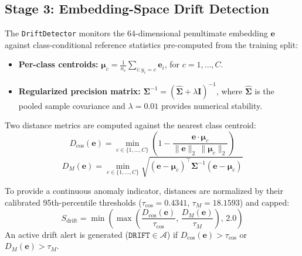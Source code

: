 \documentclass[journal]{IEEEtran}
\begin{document}
\subsection{Stage 3: Embedding-Space Drift Detection}
\label{sec:drift}
The \texttt{DriftDetector} monitors the 64-dimensional penultimate embedding $\mathbf{e}$ against class-conditional reference statistics pre-computed from the training split:
\begin{itemize}[leftmargin=*]
  \item \textbf{Per-class centroids:} $\boldsymbol{\mu}_c = \frac{1}{n_c} \sum_{i: y_i = c} \mathbf{e}_i$, for $c = 1, \ldots, C$.
  \item \textbf{Regularized precision matrix:} $\boldsymbol{\Sigma}^{-1} = (\hat{\boldsymbol{\Sigma}} + \lambda \mathbf{I})^{-1}$, where $\hat{\boldsymbol{\Sigma}}$ is the pooled sample covariance and $\lambda = 0.01$ provides numerical stability.
\end{itemize}

Two distance metrics are computed against the nearest class centroid:
\begin{equation}
  D_{\cos}(\mathbf{e}) = \min_{c \in \{1, \ldots, C\}} \left(1 - \frac{\mathbf{e} \cdot \boldsymbol{\mu}_c}{\|\mathbf{e}\|_2 \, \|\boldsymbol{\mu}_c\|_2}\right)
  \label{eq:cosine}
\end{equation}
\begin{equation}
  D_M(\mathbf{e}) = \min_{c \in \{1, \ldots, C\}} \sqrt{(\mathbf{e} - \boldsymbol{\mu}_c)^\top \boldsymbol{\Sigma}^{-1} (\mathbf{e} - \boldsymbol{\mu}_c)}
  \label{eq:mahalanobis}
\end{equation}

To provide a continuous anomaly indicator, distances are normalized by their calibrated 95th-percentile thresholds ($\tau_{\cos} = 0.4341$, $\tau_M = 18.1593$) and capped:
\begin{equation}
  S_{\text{drift}} = \min\left( \max\left( \frac{D_{\cos}(\mathbf{e})}{\tau_{\cos}}, \, \frac{D_M(\mathbf{e})}{\tau_M} \right), \, 2.0 \right)
  \label{eq:drift_score}
\end{equation}
An active drift alert is generated ($\texttt{DRIFT} \in \mathcal{A}$) if $D_{\cos}(\mathbf{e}) > \tau_{\cos}$ or $D_M(\mathbf{e}) > \tau_M$.
\end{document}
